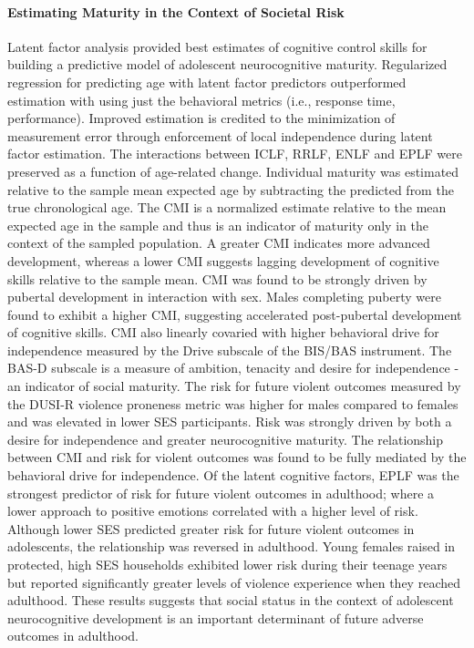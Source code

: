 \documentclass[utf8]{frontiersSCNS} %
\begin{document}
\paragraph*{Estimating Maturity in the Context of Societal Risk}
Latent factor analysis provided best estimates of cognitive control skills for building a predictive model of adolescent neurocognitive maturity. Regularized regression for predicting age with latent factor predictors outperformed estimation with using just the behavioral metrics (i.e., response time, performance). Improved estimation is credited to the minimization of measurement error through enforcement of local independence during latent factor estimation. The interactions between ICLF, RRLF, ENLF and EPLF were preserved as a function of age-related change. Individual maturity was estimated relative to the sample mean expected age by subtracting the predicted from the true chronological age. The CMI is a normalized estimate relative to the mean expected age in the sample and thus is an indicator of maturity only in the context of the sampled population. A greater CMI indicates more advanced development, whereas a lower CMI suggests lagging development of cognitive skills relative to the sample mean. CMI was found to be strongly driven by pubertal development in interaction with sex. Males completing puberty were found to exhibit a higher CMI, suggesting accelerated post-pubertal development of cognitive skills. CMI also linearly covaried with higher behavioral drive for independence measured by the Drive subscale of the BIS/BAS instrument. The BAS-D subscale is a measure of ambition, tenacity and desire for independence - an indicator of social maturity. The risk for future violent outcomes measured by the DUSI-R violence proneness metric was higher for males compared to females and was elevated in lower SES participants. Risk was strongly driven by both a desire for independence and greater neurocognitive maturity. The relationship between CMI and risk for violent outcomes was found to be fully mediated by the behavioral drive for independence. Of the latent cognitive factors, EPLF was the strongest predictor of risk for future violent outcomes in adulthood; where a lower approach to positive emotions correlated with a higher level of risk. Although lower SES predicted greater risk for future violent outcomes in adolescents, the relationship was reversed in adulthood. Young females raised in protected, high SES households exhibited lower risk during their teenage years but reported significantly greater levels of violence experience when they reached adulthood. These results suggests that social status in the context of adolescent neurocognitive development is an important determinant of future adverse outcomes in adulthood. 
\vspace{2pt}
\end{document}
